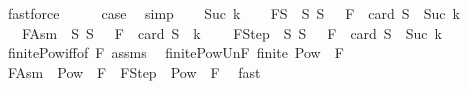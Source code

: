 \begin{isabellebody}
\ fastforce\isanewline
\ \ \isamarkupfalse%
\ \isamarkupfalse%
\ {\isacharquery}{\kern0pt}case\ \isamarkupfalse%
\ simp\isanewline
{}\isamarkupfalse%
\isanewline
\ \ \isamarkupfalse%
\ {\isacharparenleft}{\kern0pt}Suc\ k{\isacharparenright}{\kern0pt}\isanewline
\ \ \isamarkupfalse%
\ {\isacharquery}{\kern0pt}FS\ {\isacharequal}{\kern0pt}\ {\isachardoublequoteopen}{\isacharbraceleft}{\kern0pt}S{\isachardot}{\kern0pt}\ S\ {\isasymsubseteq}\ {\isasymUnion}\ F\ {\isasymand}\ card\ S\ {\isasymle}\ Suc\ k{\isacharbraceright}{\kern0pt}{\isachardoublequoteclose}\isanewline
\ \ \ {\isacharquery}{\kern0pt}F{\isacharunderscore}{\kern0pt}Asm\ {\isacharequal}{\kern0pt}\ {\isachardoublequoteopen}{\isacharbraceleft}{\kern0pt}S{\isachardot}{\kern0pt}\ S\ {\isasymsubseteq}\ {\isasymUnion}\ F\ {\isasymand}\ card\ S\ {\isasymle}\ k{\isacharbraceright}{\kern0pt}{\isachardoublequoteclose}\ \isanewline
\ \ \ {\isacharquery}{\kern0pt}F{\isacharunderscore}{\kern0pt}Step\ {\isacharequal}{\kern0pt}\ {\isachardoublequoteopen}{\isacharbraceleft}{\kern0pt}S{\isachardot}{\kern0pt}\ S\ {\isasymsubseteq}\ {\isasymUnion}\ F\ {\isasymand}\ card\ S\ {\isacharequal}{\kern0pt}\ Suc\ k{\isacharbraceright}{\kern0pt}{\isachardoublequoteclose}\isanewline
\isanewline
\ \ \isamarkupfalse%
\ finite{\isacharunderscore}{\kern0pt}Pow{\isacharunderscore}{\kern0pt}iff{\isacharbrackleft}{\kern0pt}of\ {\isachardoublequoteopen}{\isasymUnion}F{\isachardoublequoteclose}{\isacharbrackright}{\kern0pt}\ assms\ \isamarkupfalse%
\ finite{\isacharunderscore}{\kern0pt}Pow{\isacharunderscore}{\kern0pt}Un{\isacharunderscore}{\kern0pt}F{\isacharcolon}{\kern0pt}\ {\isachardoublequoteopen}finite\ {\isacharparenleft}{\kern0pt}Pow\ {\isacharparenleft}{\kern0pt}{\isasymUnion}\ F{\isacharparenright}{\kern0pt}{\isacharparenright}{\kern0pt}{\isachardoublequoteclose}\ \isacommand{{\isachardot}{\kern0pt}{\isachardot}{\kern0pt}}\isamarkupfalse%
\isanewline
\ \ \isamarkupfalse%
\ {\isachardoublequoteopen}{\isacharquery}{\kern0pt}F{\isacharunderscore}{\kern0pt}Asm\ {\isasymsubseteq}\ Pow\ {\isacharparenleft}{\kern0pt}{\isasymUnion}\ F{\isacharparenright}{\kern0pt}{\isachardoublequoteclose}\ \ {\isachardoublequoteopen}{\isacharquery}{\kern0pt}F{\isacharunderscore}{\kern0pt}Step\ {\isasymsubseteq}\ Pow\ {\isacharparenleft}{\kern0pt}{\isasymUnion}\ F{\isacharparenright}{\kern0pt}{\isachardoublequoteclose}\ \isamarkupfalse%
\ fast{\isacharplus}{\kern0pt}\isanewline

\end{isabellebody}
